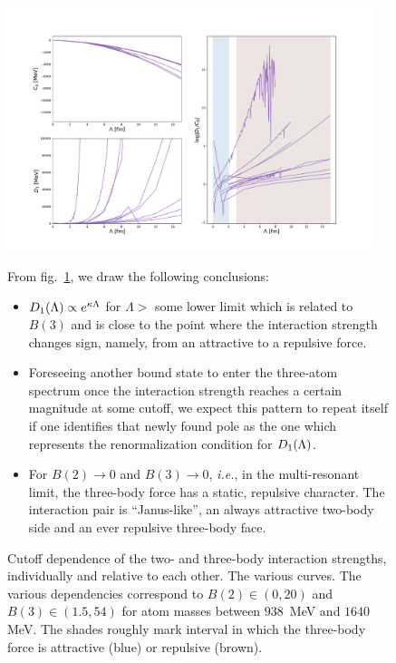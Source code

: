 \documentclass[onecolumn,preprint,superscriptaddress,nofootinbib,notitlepage,10pt,linenumbers]{revtex4-1}
\newcommand{\ie}{\textit{i.e.}\;}
\newcommand{\figref}[1]{fig.~\ref{#1}}
\newcommand{\dd}{\ensuremath D_1(\Lambda)}
\begin{document}
\begin{figure}[h] 
\centering 
\includegraphics[width=0.95\textwidth,angle=0]{./lecsets.pdf} 
\label{fig:lecs}
\caption{Cutoff dependence of the two- and three-body interaction
 strengths, individually and relative to each other. The various
 curves. The various dependencies correspond to 
 $B(2)\in (0,20)$ and $B(3)\in (1.5,54)$ for atom masses between
$938$~MeV and $1640~$MeV. The shades roughly mark interval in which the 
three-body force is attractive (blue) or repulsive (brown).}

From \figref{fig:lecs}, we draw the following conclusions:
\begin{itemize}
\item $\dd\propto e^{\kappa\Lambda}$ for $\Lambda>$ some lower limit which
is related to $B(3)$ and is close to the point where the interaction
strength changes sign, namely, from an attractive to a repulsive force.
\item Foreseeing another bound state to enter the three-atom spectrum
once the interaction strength reaches a certain magnitude at some cutoff,
we expect this pattern to repeat itself if one identifies that newly
found pole as the one which represents the renormalization condition
for $\dd$.
\item For $B(2)\to 0$ and $B(3)\to 0$, \ie, in the multi-resonant
limit, the three-body force has a static, repulsive character. The
interaction pair is ``Janus-like'', an always attractive two-body
side and an ever repulsive three-body face. 
\end{itemize}

\end{figure}
\end{document}
